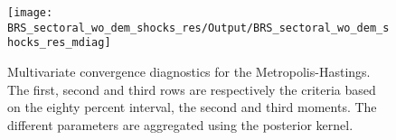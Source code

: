  
\begin{figure}[H]
\centering 
\texttt{[image: BRS\_sectoral\_wo\_dem\_shocks\_res/Output/BRS\_sectoral\_wo\_dem\_shocks\_res\_mdiag]}
\caption{Multivariate convergence diagnostics for the Metropolis-Hastings.
The first, second and third rows are respectively the criteria based on
the eighty percent interval, the second and third moments. The different 
parameters are aggregated using the posterior kernel.}\label{Fig:MultivariateDiagnostics}
\end{figure}

